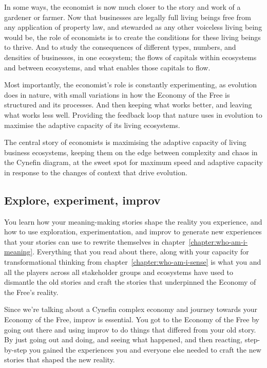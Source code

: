 In some ways, the economist is now much closer to the story and work of a gardener or farmer. Now that businesses are legally full living beings free from any application of property law, and stewarded as any other voiceless living being would be, the role of economists is to create the conditions for these living beings to thrive. And to study the consequences of different types, numbers, and densities of businesses, in one ecosystem; the flows of capitals within ecosystems and between ecosystems, and what enables those capitals to flow. 


Most importantly, the economist’s role is constantly experimenting, as evolution does in nature, with small variations in how the Economy of the Free  is structured and its processes. And then keeping what works better, and leaving what works less well. Providing the feedback loop that nature uses in evolution to maximise the adaptive capacity of its living ecosystems.


The central story of economists is maximising the adaptive capacity  of living business ecosystems, keeping them on the edge between complexity and chaos in the Cynefin diagram, at the sweet spot for maximum speed and adaptive capacity in response to the changes of context that drive evolution.


\subsection{Explore, experiment, improv}
You learn how your meaning\hyp{}making stories  shape the reality you experience, and how to use exploration, experimentation, and improv to generate new experiences that your stories can use to rewrite themselves in chapter~\ref{chapter:who-am-i-meaning}. Everything that you read about there, along with your capacity for transformational thinking from chapter~\ref{chapter:who-am-i-sense} is what you and all the players across all stakeholder groups and ecosystems have used to dismantle the old stories and craft the stories that underpinned the Economy of the Free’s reality.


Since we're talking about a Cynefin complex economy and journey towards your Economy of the Free, improv is essential. You got to the Economy of the Free by going out there and using improv to do things that differed from your old story. By just going out and doing, and seeing what happened, and then reacting, step-by-step you gained the experiences you and everyone else needed to craft the new stories that shaped the new reality.


